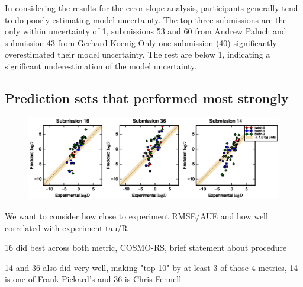 In considering the results for the error slope analysis, participants generally tend to do poorly estimating model uncertainty. 
The top three submissions are the only within uncertainty of 1, submissions 53 and 60 from Andrew Paluch %
and submission 43 from Gerhard Koenig %
Only one submission (40) significantly overestimated their model uncertainty. 
The rest are below 1, indicating a significant underestimation of the model uncertainty. 


\subsection{Prediction sets that performed most strongly}
\label{results:2}
\begin{figure} %
\includegraphics{BestGroups.eps}
\caption{}
\label{BestGroups}       %
\end{figure}
We want to consider how close to experiment RMSE/AUE and how well correlated with experiment tau/R

16 did best across both metric, COSMO-RS, brief statement about procedure

14 and 36 also did very well, making "top 10" by at least 3 of those 4 metrics, 14 is one of Frank Pickard's and 36 is Chris Fennell

